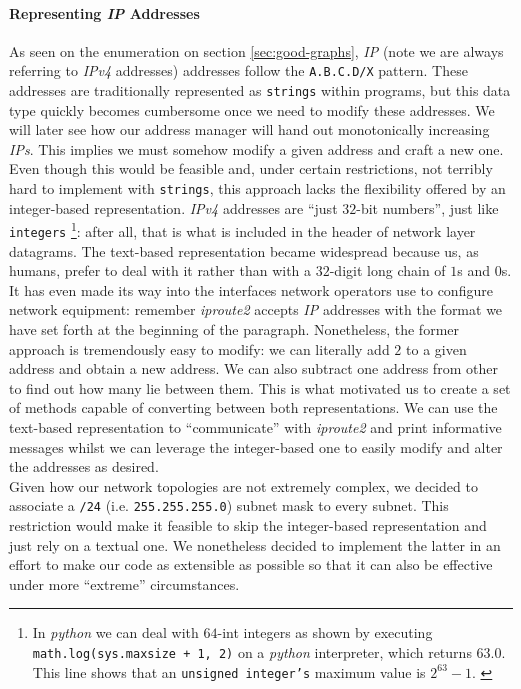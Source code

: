     \paragraph{Representing \textit{IP} Addresses}
        As seen on the enumeration on section \ref{sec:good-graphs}, \textit{IP} (note we are always referring to \textit{IPv4} addresses) addresses follow the \texttt{A.B.C.D/X} pattern. These addresses are traditionally represented as \texttt{strings} within programs, but this data type quickly becomes cumbersome once we need to modify these addresses. We will later see how our address manager will hand out monotonically increasing \textit{IPs}. This implies we must somehow modify a given address and craft a new one. Even though this would be feasible and, under certain restrictions, not terribly hard to implement with \texttt{strings}, this approach lacks the flexibility offered by an integer-based representation. \textit{IPv4} addresses are ``just $32$-bit numbers'', just like \texttt{integers} \footnote{In \textit{python} we can deal with $64$-int integers as shown by executing \texttt{math.log(sys.maxsize + 1, 2)} on a \textit{python} interpreter, which returns $63.0$. This line shows that an \texttt{unsigned integer's} maximum value is $2^{63} - 1$. \cite{bib:python-sys}}: after all, that is what is included in the header of network layer datagrams. The text-based representation became widespread because us, as humans, prefer to deal with it rather than with a $32$-digit long chain of $1$s and $0$s. It has even made its way into the interfaces network operators use to configure network equipment: remember \textit{iproute2} accepts \textit{IP} addresses with the format we have set forth at the beginning of the paragraph. Nonetheless, the former approach is tremendously easy to modify: we can literally add $2$ to a given address and obtain a new address. We can also subtract one address from other to find out how many lie between them. This is what motivated us to create a set of methods capable of converting between both representations. We can use the text-based representation to ``communicate'' with \textit{iproute2} and print informative messages whilst we can leverage the integer-based one to easily modify and alter the addresses as desired.\\

    Given how our network topologies are not extremely complex, we decided to associate a \texttt{/24} (i.e. \texttt{255.255.255.0}) subnet mask to every subnet. This restriction would make it feasible to skip the integer-based representation and just rely on a textual one. We nonetheless decided to implement the latter in an effort to make our code as extensible as possible so that it can also be effective under more ``extreme'' circumstances.\\

